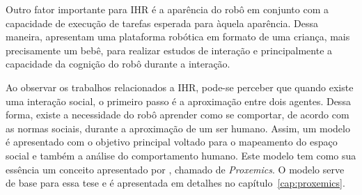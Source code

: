 Outro fator importante para IHR é a aparência do robô em conjunto com a capacidade de execução de tarefas esperada para àquela aparência. Dessa maneira,  apresentam uma plataforma robótica em formato de uma criança, mais precisamente um bebê, para realizar estudos de interação e principalmente a capacidade da cognição do robô durante a interação.

Ao observar os trabalhos relacionados a IHR, pode-se perceber que quando existe uma interação social, o primeiro passo é a aproximação entre dois agentes. Dessa forma, existe a necessidade do robô aprender como se comportar, de acordo com as normas sociais, durante a aproximação de um ser humano. Assim, um modelo é apresentado com o objetivo principal voltado para o mapeamento do espaço social e também a análise do comportamento humano. Este modelo tem como sua essência um conceito apresentado por , chamado de \emph{Proxemics}. O modelo serve de base para essa tese e é apresentada em detalhes no capítulo~\ref{cap:proxemics}.
